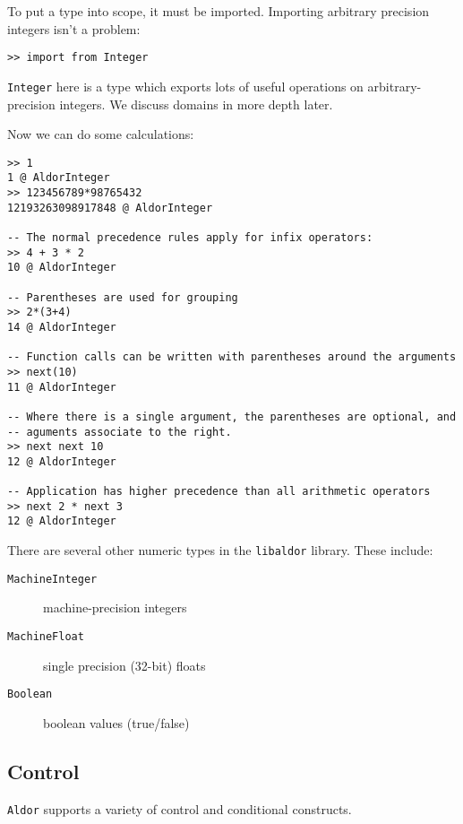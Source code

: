 \documentclass{article}
\newcommand{\libaldor}{{\tt libaldor}}
\newcommand{\Aldor}{{\tt Aldor}}
\begin{document}
To put a type into scope, it must be imported.  Importing arbitrary
precision integers isn't a problem:
\begin{small}
\begin{verbatim}
>> import from Integer
\end{verbatim}
\end{small}

{\tt Integer} here is a type which exports lots of useful operations
on arbitrary-precision integers.  We discuss domains in more depth
later.

Now we can do some calculations:
\begin{small}
\begin{verbatim}
>> 1
1 @ AldorInteger
>> 123456789*98765432
12193263098917848 @ AldorInteger

-- The normal precedence rules apply for infix operators:
>> 4 + 3 * 2
10 @ AldorInteger

-- Parentheses are used for grouping
>> 2*(3+4)
14 @ AldorInteger

-- Function calls can be written with parentheses around the arguments
>> next(10)
11 @ AldorInteger

-- Where there is a single argument, the parentheses are optional, and
-- aguments associate to the right.  
>> next next 10
12 @ AldorInteger

-- Application has higher precedence than all arithmetic operators
>> next 2 * next 3
12 @ AldorInteger
\end{verbatim}
\end{small}

There are several other numeric types in the \libaldor{} library.  These
include:
\begin{description}
\item[{\tt MachineInteger}] machine-precision integers
\item[{\tt MachineFloat}]   single precision (32-bit) floats
\item[{\tt Boolean}]        boolean values (true/false)
\end{description}

\subsection{Control}

\Aldor{} supports a variety of control and conditional constructs.
\end{document}
